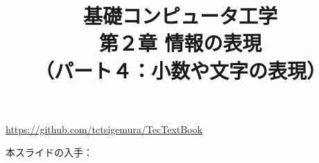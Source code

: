\documentclass[handout]{beamer}        %
\begin{document}
\title{基礎コンピュータ工学\\第２章 情報の表現\\
       （パート４：小数や文字の表現）}
\date{}

\begin{frame}
  \titlepage
  \centerline{\url{https://github.com/tctsigemura/TecTextBook}}
  \vfill
  \centerline{本スライドの入手：
    }
\end{frame}

\end{document}
